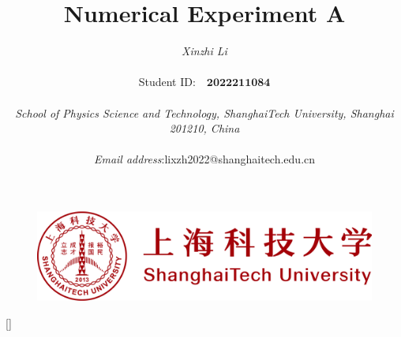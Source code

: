\documentclass[a4paper,11pt]{article}
\begin{document}
\pagestyle{fancy}
\title{\textbf{\Huge{Numerical Experiment A}}}

\author{\textit{Xinzhi Li} \\\quad\\Student ID:~~$\boldsymbol{2022211084}$\\\quad\\ \textit{School of Physics Science and Technology, ShanghaiTech University, Shanghai 201210, China}\\\quad \\ \textit{Email address}:\quad lixzh2022@shanghaitech.edu.cn}



\begin{figure}[t]
\centering
\includegraphics[width=1\columnwidth]{logo/row.png}
\end{figure}

\maketitle\thispagestyle{empty}

[]
\titlespacing{\section}{2pt}{16pt}{10pt}
\titlespacing{\subsection}{2pt}{8pt}{4pt}
\newpage
\setcounter{page}{1}
\end{document}

